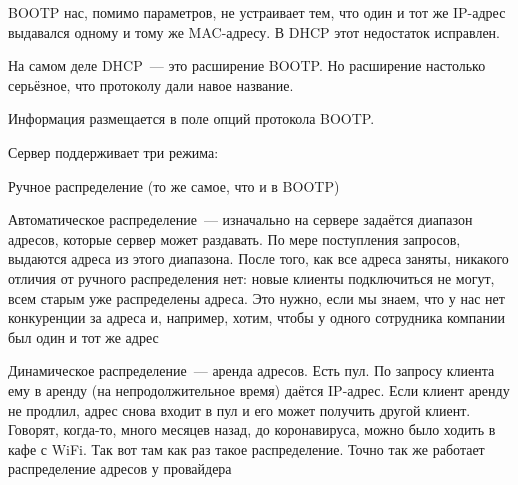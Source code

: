 BOOTP нас, помимо параметров, не устраивает тем, что один и тот же IP-адрес выдавался одному и тому же MAC-адресу. В DHCP этот недостаток исправлен. 

На самом деле DHCP~--- это расширение BOOTP. Но расширение настолько серьёзное, что протоколу дали навое название.

Информация размещается в поле опций протокола BOOTP.

Сервер поддерживает три режима:
\begin{MyItemize}
    \item Ручное распределение (то же самое, что и в BOOTP)
    \item Автоматическое распределение~--- изначально на сервере задаётся диапазон адресов, которые сервер может раздавать. По мере поступления запросов, выдаются адреса из этого диапазона. После того, как все адреса заняты, никакого отличия от ручного распределения нет: новые клиенты подключиться не могут, всем старым уже распределены адреса. Это нужно, если мы знаем, что у нас нет конкуренции за адреса и, например, хотим, чтобы у одного сотрудника компании был один и тот же адрес
    \item Динамическое распределение~--- аренда адресов. Есть пул. По запросу клиента ему в аренду (на непродолжительное время) даётся IP-адрес. Если клиент аренду не продлил, адрес снова входит в пул и его может получить другой клиент. Говорят, когда-то, много месяцев назад, до коронавируса, можно было ходить в кафе с WiFi. Так вот там как раз такое распределение. Точно так же работает распределение адресов у провайдера
\end{MyItemize}

